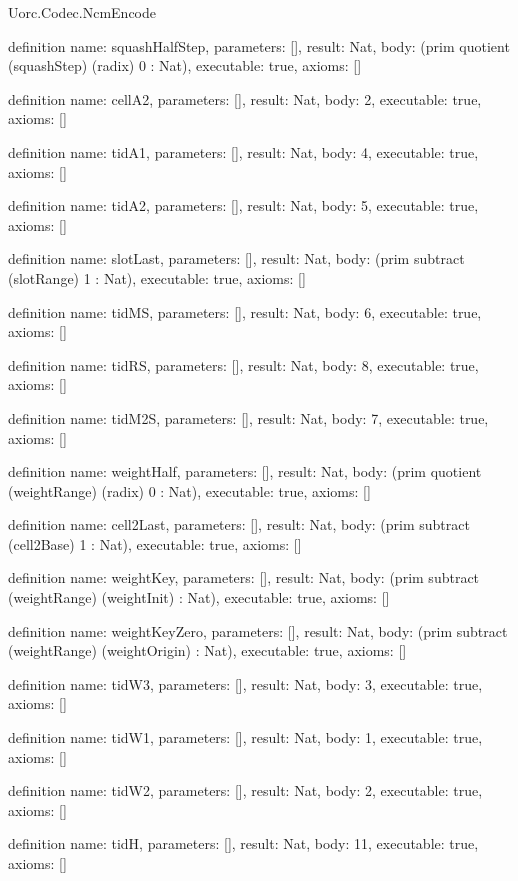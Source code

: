 \begin{lexlean}{Uorc.Codec.NcmEncode}
\begin{semanticmodule}
definition{
  name: squashHalfStep,
  parameters: [],
  result: Nat,
  body: (prim quotient (squashStep) (radix) 0 : Nat),
  executable: true,
  axioms: []
}

definition{
  name: cellA2,
  parameters: [],
  result: Nat,
  body: 2,
  executable: true,
  axioms: []
}

definition{
  name: tidA1,
  parameters: [],
  result: Nat,
  body: 4,
  executable: true,
  axioms: []
}

definition{
  name: tidA2,
  parameters: [],
  result: Nat,
  body: 5,
  executable: true,
  axioms: []
}

definition{
  name: slotLast,
  parameters: [],
  result: Nat,
  body: (prim subtract (slotRange) 1 : Nat),
  executable: true,
  axioms: []
}

definition{
  name: tidMS,
  parameters: [],
  result: Nat,
  body: 6,
  executable: true,
  axioms: []
}

definition{
  name: tidRS,
  parameters: [],
  result: Nat,
  body: 8,
  executable: true,
  axioms: []
}

definition{
  name: tidM2S,
  parameters: [],
  result: Nat,
  body: 7,
  executable: true,
  axioms: []
}

definition{
  name: weightHalf,
  parameters: [],
  result: Nat,
  body: (prim quotient (weightRange) (radix) 0 : Nat),
  executable: true,
  axioms: []
}

definition{
  name: cell2Last,
  parameters: [],
  result: Nat,
  body: (prim subtract (cell2Base) 1 : Nat),
  executable: true,
  axioms: []
}

definition{
  name: weightKey,
  parameters: [],
  result: Nat,
  body: (prim subtract (weightRange) (weightInit) : Nat),
  executable: true,
  axioms: []
}

definition{
  name: weightKeyZero,
  parameters: [],
  result: Nat,
  body: (prim subtract (weightRange) (weightOrigin) : Nat),
  executable: true,
  axioms: []
}

definition{
  name: tidW3,
  parameters: [],
  result: Nat,
  body: 3,
  executable: true,
  axioms: []
}

definition{
  name: tidW1,
  parameters: [],
  result: Nat,
  body: 1,
  executable: true,
  axioms: []
}

definition{
  name: tidW2,
  parameters: [],
  result: Nat,
  body: 2,
  executable: true,
  axioms: []
}

definition{
  name: tidH,
  parameters: [],
  result: Nat,
  body: 11,
  executable: true,
  axioms: []
}


\end{semanticmodule}
\end{lexlean}
